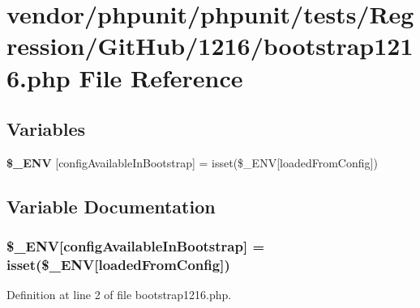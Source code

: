\section{vendor/phpunit/phpunit/tests/\+Regression/\+Git\+Hub/1216/bootstrap1216.php File Reference}
\label{bootstrap1216_8php}
\subsection*{Variables}
\begin{DoxyCompactItemize}
\item 
{\bf \$\+\_\+\+E\+N\+V} [\textquotesingle{}config\+Available\+In\+Bootstrap\textquotesingle{}] = isset(\$\+\_\+\+E\+N\+V[\textquotesingle{}loaded\+From\+Config\textquotesingle{}])
\end{DoxyCompactItemize}


\subsection{Variable Documentation}
\subsubsection[{\$\+\_\+\+E\+N\+V}]{\setlength{\rightskip}{0pt plus 5cm}\$\+\_\+\+E\+N\+V[\textquotesingle{}config\+Available\+In\+Bootstrap\textquotesingle{}] = isset(\$\+\_\+\+E\+N\+V[\textquotesingle{}loaded\+From\+Config\textquotesingle{}])}\label{bootstrap1216_8php_a9463534bf0cd9c6a1633fab190a8b2fa}


Definition at line 2 of file bootstrap1216.\+php.

